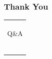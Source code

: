 \documentclass[12pt]{beamer}
\begin{document}
    \begin{frame}
        \frametitle{Thank You}
        \begin{table}[h!]
        \centering
                \begin{tabular}{ c }
                    \\
                    \\
                    \\
                    \\
                        \huge{Q\&A}\\
                        \\
                        \\
                        \\
                        \\
                        \\
                        \\
                \end{tabular}
        \end{table}
    \end{frame}
\end{document}

